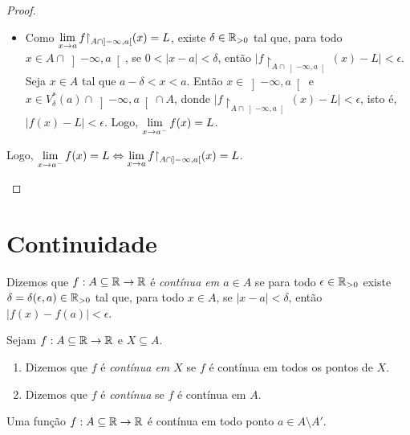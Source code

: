 \begin{proof}
\begin{enumerate}[leftmargin=*, align=left, label=\textbf{(\alph*)}]
\begin{itemize}
                    \item[($\Leftarrow$)] Como $\ds \lim_{x \to a} f \restriction_{A \cap \left]-\infty,a\right[}(x) = L$, existe $\delta \in \mathbb{R}_{>0}$ tal que, para todo $x \in A \cap \left]-\infty,a\right[$, se $0 < |x-a| < \delta$, então $|f \restriction_{A \cap \left]-\infty,a\right[}(x) - L| < \epsilon$. Seja $x \in A$ tal que $a-\delta < x < a$. Então $x \in \left]-\infty,a\right[$ e $x \in V^*_{\delta}(a) \cap \left]-\infty,a\right[ \cap A$, donde $|f \restriction_{A \cap \left]-\infty,a\right[}(x) - L| < \epsilon$, isto é, $|f(x) - L| < \epsilon$. Logo, $\displaystyle \lim_{x \to a^-} f(x) = L$.
                \end{itemize}
            Logo, $\ds \lim_{x \to a^-} f(x) = L \Leftrightarrow \lim_{x \to a} f \restriction_{A \cap \left]-\infty, a \right[ } (x) = L$. \blackproof
        \end{enumerate}
\end{proof}

\section{Continuidade}

\begin{definition}[Continuidade] \label{def.calc1:continuidade}
    Dizemos que $f : A \subseteq \mathbb{R} \to \mathbb{R}$ é \emph{contínua em $a \in A$} se para todo $\epsilon \in \mathbb{R}_{>0}$ existe $\delta = \delta(\epsilon, a) \in \mathbb{R}_{>0}$ tal que, para todo $x \in A$, se $|x-a|<\delta$, então $|f(x) - f(a)| < \epsilon$.
\end{definition}

\begin{definition}
    Sejam $f : A \subseteq \mathbb{R} \to \mathbb{R}$ e $X \subseteq A$.
        \begin{enumerate}[leftmargin=*, align=left, label=\textbf{(\alph*)}]
            \item Dizemos que $f$ é \emph{contínua em $X$} se $f$ é contínua em todos os pontos de $X$.
            \item Dizemos que $f$ é \emph{contínua} se $f$ é contínua em $A$.
        \end{enumerate}
\end{definition}

\begin{proposition} \label{prop.calc1:continuidade_em_ponto_isolado}
    Uma função $f : A \subseteq \mathbb{R} \to \mathbb{R}$ é contínua em todo ponto $a \in A \setminus A'$.
\end{proposition}

